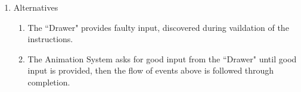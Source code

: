 \documentclass[12pt]{article}
\begin{document}
\begin{enumerate}
\begin{enumerate}
\begin{enumerate}
\begin{enumerate}
  \end{enumerate}
  \item Alternatives
  \begin{enumerate}
    		\item The ``Drawer" provides faulty input, discovered during vaildation of the instructions.
		    \item The Animation System asks for good input from the ``Drawer" until good input is provided, then the flow of events above is followed through completion.
  \end{enumerate}
\end{enumerate}




\end{enumerate}
\end{enumerate}
\end{document}
